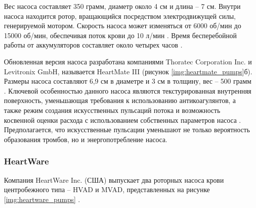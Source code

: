 Вес насоса составляет 350 грамм, диаметр около 4 см и длина -- 7 см. Внутри насоса находится ротор, вращающийся посредством электродвижущей силы, генерируемой мотором. Скорость насоса может изменяться от 6000 об/мин до 15000 об/мин, обеспечивая поток крови до 10 л/мин \cite{Loforte20091357}. Время бесперебойной работы от аккумуляторов составляет около четырех часов \cite{Griffith_2001}. 

Обновленная версия насоса разработана компаниями Thoratec Corporation Inc. и Levitronix GmbH, называется HeartMate III (рисунок \ref{img:heartmate_pumps}б). Размеры насоса составляют 6,9 см в диаметре и 3 см в толщину, вес -- 500 грамм \cite{farrar2007design}. Ключевой особенностью данного насоса являются текстурированная внутренняя поверхность, уменьшающая требования к использованию антикоагулянтов, а также режим создания искусственных пульсаций потока и возможность косвенной оценки расхода с использованием собственных параметров насоса \cite{heartmate_speed_modulations, Schumerehv590}. Предполагается, что искусственные пульсации уменьшают не только вероятность образования тромбов, но и энергопотребление насоса. 

\subsubsection*{HeartWare}

Компания HeartWare Inc. (США) выпускает два роторных насоса крови центробежного типа -- HVAD и MVAD, представленных на рисунке \ref{img:heartware_pumps} \cite{larose2010design, cheung2015design}.
 

